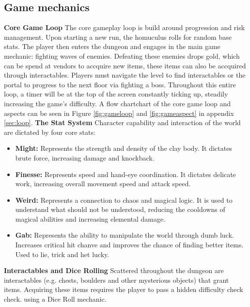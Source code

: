 \documentclass[progress]{cmpreport}
\begin{document}
\subsection{Game mechanics}
\textbf{Core Game Loop}
\newline
The core gameplay loop is build around progression and risk management. Upon starting a new run, the homuculus rolls for random base stats. The player then enters the dungeon and engages in the main game mechanic: 
fighting waves of enemies. Defeating these enemies drops gold, which can be spend at vendors to accquire new items, these items can also be accquired through interactables. Players must navigate the level to find 
interactables or the portal to progress to the next floor via fighting a boss. Throughout this entire loop, a timer will be at the top of the screen constantly ticking up, steadily increasing the game's difficulty.
A flow chartchart of the core game loop and aspects can be seen in Figure \ref{fig:gameloop} and \ref{fig:gameaspect} in appendix \ref{sec:loop}.
\newline
\newline 
\textbf{The Stat System}
\newline
Character capability and interaction of the world are dictated by four core stats:
\begin{itemize}
    \item \textbf{Might:} Represents the strength and density of the clay body. It dictates brute force, increasing damage and knockback.
    \item \textbf{Finesse:} Represents speed and hand-eye coordination. It dictates delicate work, increasing overall movement speed and attack speed.
    \item \textbf{Weird:} Represents a connection to chaos and magical logic. It is used to understand what should not be understood, reducing the cooldowns of magical abilities and increasing elemental damage.
    \item \textbf{Gab:} Represents the ability to manipulate the world through dumb luck. Increases critical hit chanve and improves the chance of finding better items. Used to lie, trick and het lucky.
\end{itemize}
\textbf{Interactables and Dice Rolling}
\newline
Scattered throughout the dungeon are interactables (e.g. chests, boulders and other mysterious objects) that grant items. Acquiring these items requires the player to pass a hidden difficulty check check. using a Dice Roll mechanic. 
\end{document}

